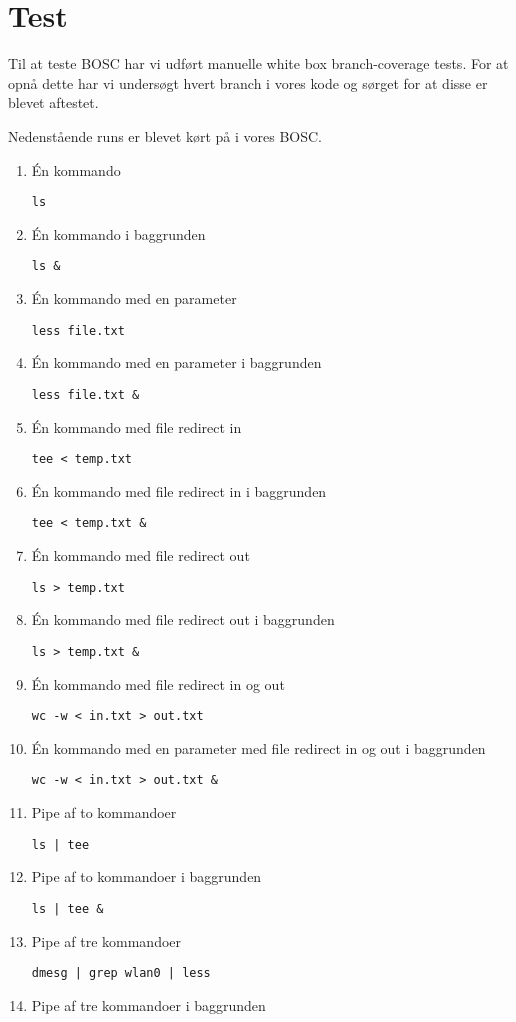 \section{Test}
Til at teste BOSC har vi udført manuelle white box branch-coverage tests. For at opnå dette har vi undersøgt hvert branch i vores kode og sørget for at disse er blevet aftestet.

Nedenstående runs er blevet kørt på i vores BOSC.

\begin{enumerate}
	\item Én kommando
	
	\verb+ls+
	\item Én kommando i baggrunden
	
	\verb+ls &+
	\item Én kommando med en parameter
	
	\verb+less file.txt+
	\item Én kommando med en parameter i baggrunden
	
	\verb+less file.txt &+
	\item Én kommando med file redirect in
	
	\verb+tee < temp.txt+
	\item Én kommando med file redirect in i baggrunden
	
	\verb+tee < temp.txt &+
	\item Én kommando med file redirect out
	
	\verb+ls > temp.txt+
	\item Én kommando med file redirect out i baggrunden
	
	\verb+ls > temp.txt &+
	\item Én kommando med file redirect in og out
	
	\verb+wc -w < in.txt > out.txt+
	\item Én kommando med en parameter med file redirect in og out i baggrunden
	
	\verb+wc -w < in.txt > out.txt &+
	\item Pipe af to kommandoer
	
	\verb+ls | tee+
	\item Pipe af to kommandoer i baggrunden
	
	\verb+ls | tee &+
	\item Pipe af tre kommandoer
	
	\verb+dmesg | grep wlan0 | less+
	\item Pipe af tre kommandoer i baggrunden
	

\end{enumerate}
